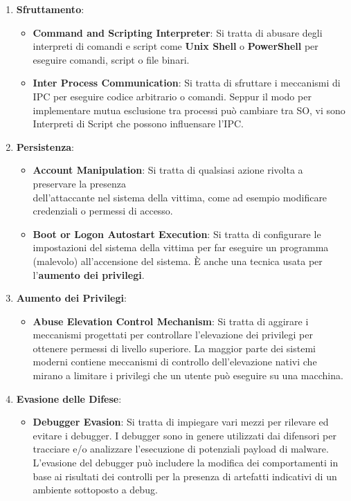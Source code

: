 \documentclass{article}
\begin{document}
\begin{enumerate}
    \item \textbf{Sfruttamento}:
        \begin{itemize}
            \item \textbf{Command and Scripting Interpreter}: Si tratta di abusare degli interpreti di comandi e script come \textbf{Unix Shell} o \textbf{PowerShell} per eseguire comandi, script o file binari.

            \item \textbf{Inter Process Communication}: Si tratta di sfruttare i meccanismi di IPC per eseguire codice arbitrario o comandi. Seppur il modo per implementare mutua esclusione tra processi può cambiare tra SO, vi sono Interpreti di Script che possono influensare l'IPC.
        \end{itemize}

    \item \textbf{Persistenza}:
        \begin{itemize}
            \item \textbf{Account Manipulation}: Si tratta di qualsiasi azione rivolta a preservare la presenza\\ dell'attaccante nel sistema della vittima, come ad esempio modificare credenziali o permessi di accesso.

            \item \textbf{Boot or Logon Autostart Execution}: Si tratta di configurare le impostazioni del sistema della vittima per far eseguire un programma (malevolo) all'accensione del sistema. È anche una tecnica usata per l'\textbf{aumento dei privilegi}.
        \end{itemize}

    \item \textbf{Aumento dei Privilegi}:
        \begin{itemize}
            \item \textbf{Abuse Elevation Control Mechanism}: Si tratta di aggirare i meccanismi progettati per controllare l'elevazione dei privilegi per ottenere permessi di livello superiore. La maggior parte dei sistemi moderni contiene meccanismi di controllo dell'elevazione nativi che mirano a limitare i privilegi che un utente può eseguire su una macchina. 
        \end{itemize}

    \item \textbf{Evasione delle Difese}:
        \begin{itemize}
            \item \textbf{Debugger Evasion}: Si tratta di impiegare vari mezzi per rilevare ed evitare i debugger. I debugger sono in genere utilizzati dai difensori per tracciare e/o analizzare l'esecuzione di potenziali payload di malware.\\
            L'evasione del debugger può includere la modifica dei comportamenti in base ai risultati dei controlli per la presenza di artefatti indicativi di un ambiente sottoposto a debug.


\end{itemize}
\end{enumerate}
\end{document}
